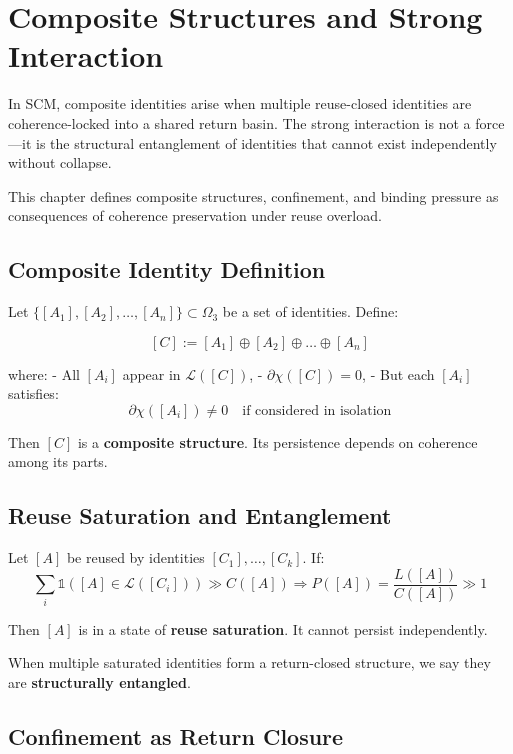 \chapter{Composite Structures and Strong Interaction} \label{chapter-strong-interaction}

In SCM, composite identities arise when multiple reuse-closed identities are coherence-locked into a shared return basin. The strong interaction is not a force—it is the structural entanglement of identities that cannot exist independently without collapse.

This chapter defines composite structures, confinement, and binding pressure as consequences of coherence preservation under reuse overload.

\section{Composite Identity Definition} \label{sec:composite-definition}

Let $\{ [A_1], [A_2], \dots, [A_n] \} \subset \Omega_3$ be a set of identities. Define:

\[
[C] := [A_1] \oplus [A_2] \oplus \dots \oplus [A_n]
\]

where:
- All $[A_i]$ appear in $\mathcal{L}([C])$,
- $\partial\chi([C]) = 0$,
- But each $[A_i]$ satisfies:
  \[
  \partial\chi([A_i]) \ne 0 \quad \text{if considered in isolation}
  \]

Then $[C]$ is a \textbf{composite structure}. Its persistence depends on coherence among its parts.

\section{Reuse Saturation and Entanglement} \label{sec:reuse-saturation}

Let $[A]$ be reused by identities $[C_1], \dots, [C_k]$. If:
\[
\sum_i \mathbb{1}([A] \in \mathcal{L}([C_i])) \gg C([A])
\Rightarrow P([A]) = \frac{L([A])}{C([A])} \gg 1
\]

Then $[A]$ is in a state of \textbf{reuse saturation}. It cannot persist independently.

When multiple saturated identities form a return-closed structure, we say they are \textbf{structurally entangled}.

\section{Confinement as Return Closure} \label{sec:confinement}

